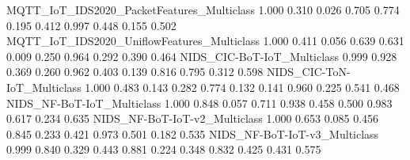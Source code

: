 MQTT_IoT_IDS2020_PacketFeatures_Multiclass                                 1.000            0.310                                    0.026                           0.705           0.774                    0.195                                                     0.412                                     0.997                                     0.448                              0.155   0.502
MQTT_IoT_IDS2020_UniflowFeatures_Multiclass                                1.000            0.411                                    0.056                           0.639           0.631                    0.009                                                     0.250                                     0.964                                     0.292                              0.390   0.464
NIDS_CIC-BoT-IoT_Multiclass                                                0.999            0.928                                    0.369                           0.260           0.962                    0.403                                                     0.139                                     0.816                                     0.795                              0.312   0.598
NIDS_CIC-ToN-IoT_Multiclass                                                1.000            0.483                                    0.143                           0.282           0.774                    0.132                                                     0.141                                     0.960                                     0.225                              0.541   0.468
NIDS_NF-BoT-IoT_Multiclass                                                 1.000            0.848                                    0.057                           0.711           0.938                    0.458                                                     0.500                                     0.983                                     0.617                              0.234   0.635
NIDS_NF-BoT-IoT-v2_Multiclass                                              1.000            0.653                                    0.085                           0.456           0.845                    0.233                                                     0.421                                     0.973                                     0.501                              0.182   0.535
NIDS_NF-BoT-IoT-v3_Multiclass                                              0.999            0.840                                    0.329                           0.443           0.881                    0.224                                                     0.348                                     0.832                                     0.425                              0.431   0.575
